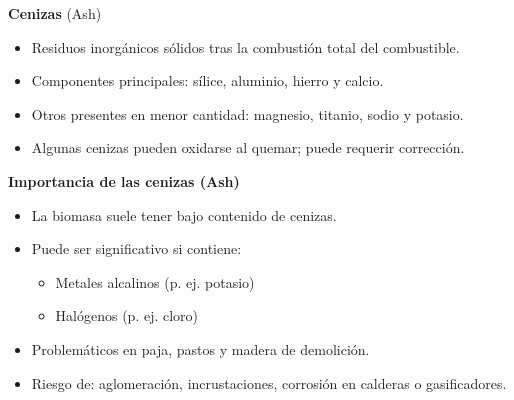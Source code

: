 \documentclass[../../main.tex]{subfiles}
\begin{document}
\begin{frame}{\textbf{Cenizas} (Ash)}
\begin{itemize}
    \item Residuos inorg\'anicos s\'olidos tras la combusti\'on total del combustible.
    \item Componentes principales: s\'ilice, aluminio, hierro y calcio.
    \item Otros presentes en menor cantidad: magnesio, titanio, sodio y potasio.
    \item Algunas cenizas pueden oxidarse al quemar; puede requerir correcci\'on.
\end{itemize}

\textbf{Importancia de las cenizas (Ash)}
\begin{itemize}
    \item La biomasa suele tener bajo contenido de cenizas.
    \item Puede ser significativo si contiene:
    \begin{itemize}
        \item Metales alcalinos (p. ej. potasio)
        \item Hal\'ogenos (p. ej. cloro)
    \end{itemize}
    \item Problem\'aticos en paja, pastos y madera de demolici\'on.
    \item Riesgo de: aglomeraci\'on, incrustaciones, corrosi\'on en calderas o gasificadores.
\end{itemize}
\end{frame}
\end{document}
